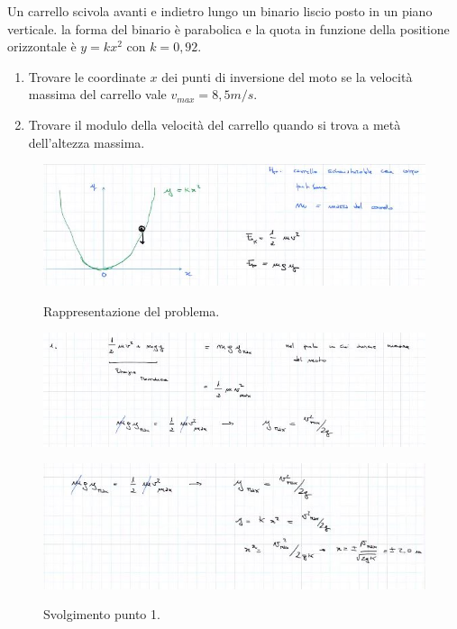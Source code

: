 \begin{esempio}
	Un carrello scivola avanti e indietro lungo un binario liscio posto in un piano verticale. la forma del binario è parabolica e la quota in funzione della positione orizzontale è $y=kx^2$ con $k=0,92$.
	\begin{enumerate}
		\item Trovare le coordinate $x$ dei punti di inversione del moto se la velocità massima del carrello vale $v_{max}=8,5 m/s$.
		\item Trovare il modulo della velocità del carrello quando si trova a metà dell'altezza massima.
	\end{enumerate}
	\begin{figure}[h]
	\begin{center}
		\includegraphics[width=12cm]{lezione7/images/8Precorsolavoroedenergia.jpg}\\
		\caption{Rappresentazione del problema.}
	\end{center}
\end{figure}
	\begin{figure}[h]
	\begin{center}
		\includegraphics[width=12cm]{lezione7/images/9Precorsolavoroedenergia.jpg}\\
		\caption{}
	\end{center}
\end{figure}

	\begin{figure}[h]
	\begin{center}
		\includegraphics[width=12cm]{lezione7/images/10Precorsolavoroedenergia.jpg}\\
		\caption{Svolgimento punto 1.}
	\end{center}
\end{figure}


\end{esempio}
